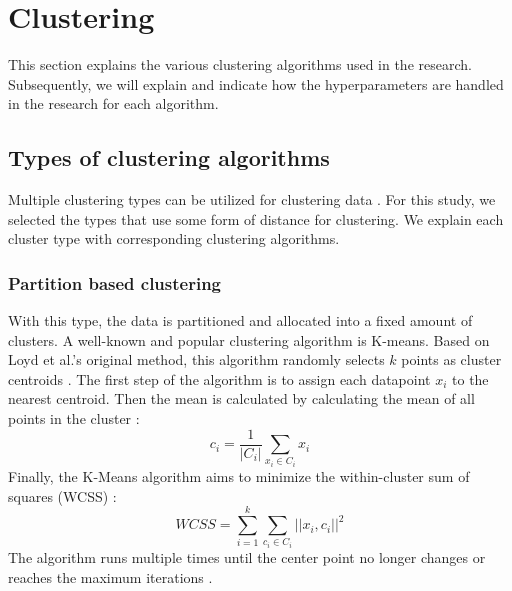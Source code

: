 \section{Clustering}
This section explains the various clustering algorithms used in the research.
Subsequently, we will explain and indicate how the hyperparameters are handled in the research for each algorithm.
\subsection{Types of clustering algorithms}
Multiple clustering types can be utilized for clustering data \citep{xu_comprehensive_2015}.
For this study, we selected the types that use some form of distance for clustering.
We explain each cluster type with corresponding clustering algorithms.
\subsubsection{Partition based clustering}
With this type, the data is partitioned and allocated into a fixed amount of clusters.
A well-known and popular clustering algorithm is K-means.
Based on Loyd et al.'s original method, this algorithm randomly selects $k$ points as cluster centroids \citep{1056489}.
The first step of the algorithm is to assign each datapoint $x_i$ to the nearest centroid.
Then the mean is calculated by calculating the mean of all points in the cluster \citep{yuan_research_2019}:
\begin{equation}
    c_i = \frac{1}{|C_i|} \sum_{x_i \in C_i} x_i
\end{equation}
Finally, the K-Means algorithm aims to minimize the within-cluster sum of squares (WCSS) \citep{yuan_research_2019}:
\begin{equation}
    WCSS = \sum_{i=1}^{k} \sum_{c_i \in C_i} || x_i, c_i ||^2
\end{equation}
The algorithm runs multiple times until the center point no longer changes or reaches the maximum iterations \citep{yuan_research_2019}.


